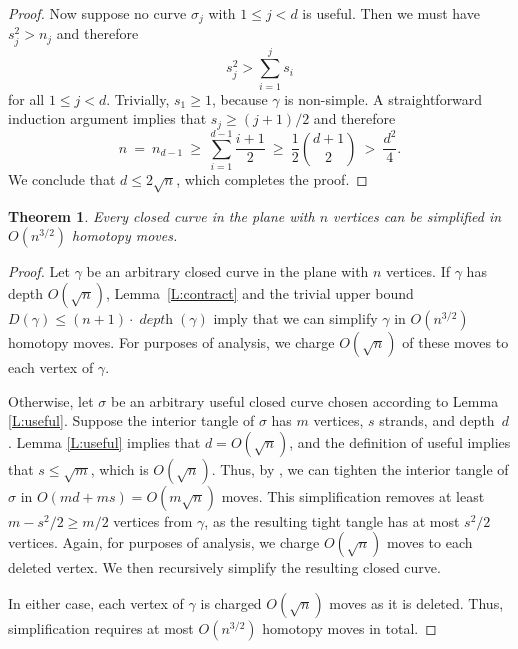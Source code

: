 \documentclass[11pt,twoside]{article}
\def\Depth{\operatorname{\mathit{depth}}}
\let\EDIT\relax
\newtheorem{theorem}{Theorem}[section]
\numberwithin{figure}{section}
\begin{document}
\begin{proof}
Now suppose no curve $\sigma_j$ with $1\le j <d$ is useful.  Then we must have $s_j^2 > n_j$ and therefore 
\[
	s_j^2 > \sum_{i=1}^j s_i
\]
for all $1\le j < d$.  Trivially, $s_1\ge 1$, because $\gamma$ is non-simple. 
A straightforward induction argument implies that $s_j \ge (j+1)/2$
and therefore
\[
	n
	~=~ n_{d-1}
	~\ge~ \sum_{i = 1}^{d-1} \frac{i+1}{2}
	~\ge~ \frac{1}{2} \binom{d+1}{2}
	~>~ \frac{d^2}{4}.
\]
We conclude that $d \le 2\sqrt{n}$, which completes the proof.
\end{proof}

\begin{theorem}
\label{Th:upper}
Every closed curve in the plane with $n$ vertices can be simplified in $O(n^{3/2})$ homotopy moves.
\end{theorem}

\begin{proof}
Let $\gamma$ be an arbitrary closed curve in the plane with $n$ vertices.  If $\gamma$ has depth $O(\sqrt{n})$, Lemma~\ref{L:contract} and the trivial upper bound $D(\gamma) \le {(n+1)}\cdot \Depth(\gamma)$ imply that we can simplify $\gamma$ in $O(n^{3/2})$ homotopy moves. For purposes of analysis, we charge $O(\sqrt{n})$ of these moves to each vertex of $\gamma$. 
%

Otherwise, let $\sigma$ be an arbitrary useful closed curve chosen according to Lemma \ref{L:useful}. Suppose the interior tangle of $\sigma$ has $m$ vertices, $s$ strands, and depth~$d$.  Lemma \ref{L:useful} implies that $d = O(\sqrt{n})$, and the definition of useful implies that $s \le \sqrt{m}$, which is $O(\sqrt{n})$. Thus, by \EDIT{Corollary \ref{C:tangle}}, we can tighten the interior tangle of $\sigma$ in $O(m d + m s) = O(m \sqrt{n})$ moves. This simplification removes at least $m - s^2/2 \ge m/2$ vertices from $\gamma$, as the resulting tight tangle has at most $s^2/2$ vertices.  Again, for purposes of analysis, we charge $O(\sqrt{n})$ moves to each deleted vertex. We then recursively simplify the resulting closed curve.

In either case, each vertex of $\gamma$ is charged $O(\sqrt{n})$ moves as it is deleted. Thus, simplification requires at most $O(n^{3/2})$ homotopy moves in total.
\end{proof}
\end{document}
